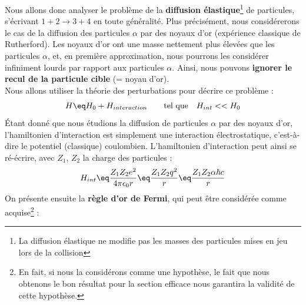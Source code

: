 Nous allons donc analyser le problème de la \textbf{diffusion élastique}\footnote{La diffusion élastique ne modifie pas les masses des particules mises en jeu lors de la collision} de particules, s'écrivant $1+2 \rightarrow 3+4$ en toute généralité. Plus précisément, nous considérerons le cas de la diffusion des particules $\alpha$ par des noyaux d'or (expérience classique de Rutherford). Les noyaux d'or ont une masse nettement plus élevées que les particules $\alpha$, et, en première approximation, nous pourrons les considérer infiniment lourds par rapport aux particules $\alpha$. Ainsi, nous pouvons \textbf{ignorer le recul de la particule cible }(= noyau d'or).\\
Nous allons utiliser la théorie des perturbations pour décrire ce problème :
\begin{equation*}
    H \eq H_0 + H_{interaction} \qquad \textrm{tel que} \quad H_{int} << H_0
\end{equation*}
Étant donné que nous étudions la diffusion de particules $\alpha$ par des noyaux d'or, l'hamiltonien d'interaction est simplement une interaction électrostatique, c'est-à-dire le potentiel (classique) coulombien. L'hamiltonien d'interaction peut ainsi se ré-écrire, avec $Z_1$, $Z_2$ la charge des particules :
\begin{equation*}
    H_{int} \eq 
    \frac{Z_1 Z_2 e^2}{4\pi \epsilon_0 r} 
    \eq \frac{Z_1 Z_2 q^2}{r} 
    \eq \frac{Z_1 Z_2 \alpha \hbar c}{r}
\end{equation*}
On présente ensuite la \textbf{règle d'or de Fermi}, qui peut être considérée comme acquise\footnote{En fait, si nous la considérons comme une hypothèse, le fait que nous obtenons le bon résultat pour la section efficace nous garantira la validité de cette hypothèse.} :\\
\vspace{.2cm}

